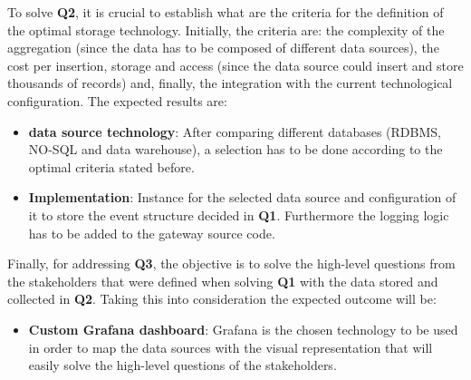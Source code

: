 \documentclass[12pt]{article}
\begin{document}
To solve \textbf{Q2}, it is crucial to establish what are the criteria for the definition of the optimal storage technology. Initially, the criteria are: the complexity of the aggregation (since the data has to be composed of different data sources), the cost per insertion, storage and access (since the data source could insert and store thousands of records) and, finally, the integration with the current technological configuration. The expected results are:

\begin{itemize}
    \item \textbf{data source technology}: After comparing different databases (RDBMS, NO-SQL and data warehouse), a selection has to be done according to the optimal criteria stated before.
    \item \textbf{Implementation}: Instance for the selected data source and configuration of it to store the event structure decided in \textbf{Q1}. Furthermore the logging logic has to be added to the gateway source code.
\end{itemize}

Finally, for addressing \textbf{Q3}, the objective is to solve the high-level questions from the stakeholders that were defined when solving \textbf{Q1} with the data stored and collected in \textbf{Q2}. Taking this into consideration the expected outcome will be:

\begin{itemize}
    \item \textbf{Custom Grafana dashboard}: Grafana is the chosen technology to be used in order to map the data sources with the visual representation that will easily solve the high-level questions of the stakeholders.
\end{itemize}



\end{document}
